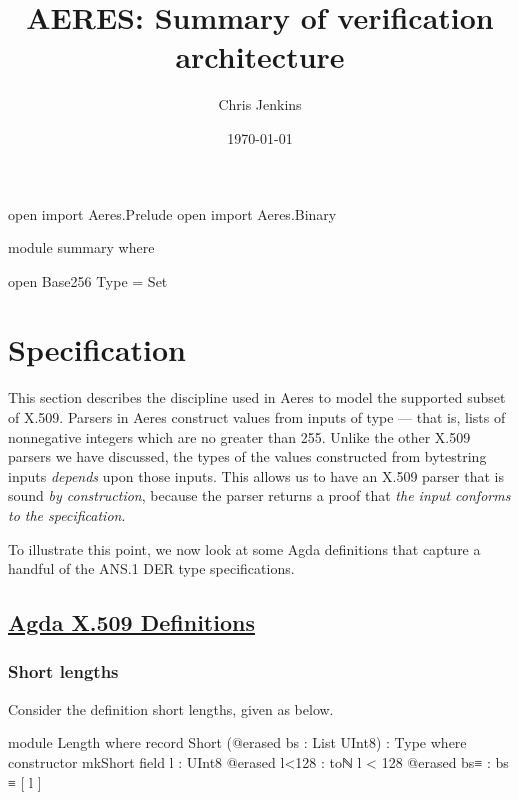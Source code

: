 \documentclass[11pt]{article}
\author{Chris Jenkins}
\date{\today}
\title{AERES: Summary of verification architecture}
\begin{document}
\maketitle
\begin{code}[hide]
open import Aeres.Prelude
open import Aeres.Binary

module summary where

open Base256
Type = Set
\end{code}

\section{Specification}
\label{sec:org58d4053}

This section describes the discipline used in Aeres to model the supported
subset of X.509.
Parsers in Aeres construct values from inputs of type
\AgdaSpace{} --- that is, lists of
nonnegative integers which are no greater than 255.
Unlike the other X.509 parsers we have discussed, the types of the values
constructed from bytestring inputs \emph{depends} upon those inputs.
This allows us to have an X.509 parser that is sound \emph{by construction},
because the parser returns a proof that \emph{the input conforms to the
specification}.

To illustrate this point, we now look at some Agda definitions that capture a
handful of the ANS.1 DER type specifications.


\subsection{\href{../src/Aeres/Data/X509.agda}{Agda X.509 Definitions}}
\label{sec:org1b97c86}
\subsubsection{Short lengths}
\label{sec:org653af72}
Consider the definition short lengths, given as  below.

\begin{code}
module Length where
  record Short (@erased bs : List UInt8) : Type where
    constructor mkShort
    field
      l : UInt8
      @erased l<128 : toℕ l < 128
      @erased bs≡ : bs ≡ [ l ]
\end{code}
\end{document}
